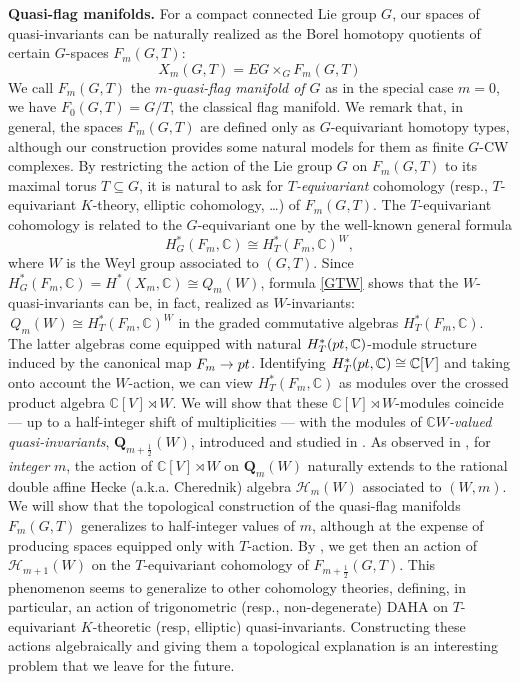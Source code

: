 \documentclass[11pt]{amsart}
\theoremstyle{definition}
\theoremstyle{remark}
\numberwithin{equation}{section}
\newcommand{\la}{\label}
\def\C{\mathbb C}
\begin{document}
\vspace*{1ex}

\noindent
{\bf Quasi-flag manifolds.} 
For a compact connected Lie group $G$, our spaces of quasi-invariants can be naturally realized as the Borel homotopy quotients of certain $G$-spaces  $ F_m(G,T) $:
%
$$ 
X_m(G,T) = EG \times_G F_m(G,T)
$$
%
We call $ F_m(G,T) $ the {\it $m$-quasi-flag manifold of $G$} as in the special case $ m = 0 $, we have $ F_0(G,T) =G/T $, the classical flag manifold. We remark that, in general, the spaces $ F_m(G,T)$ are defined only as $G$-equivariant homotopy types, although our construction provides some natural models
for them as finite $G$-CW complexes. By restricting the action of the Lie group $G$ on $ F_m(G,T)$ to its maximal torus $ T \subseteq G  $, it is natural to ask for {\it $T$-equivariant} cohomology (resp., $T$-equivariant $K$-theory, elliptic cohomology, \ldots) of $F_m(G,T)$. The $T$-equivariant cohomology is related to the $G$-equivariant one by the well-known general formula
%
\begin{equation}\la{GTW}
H^*_G(F_m, \C) \cong H^*_T(F_m, \C)^W , 
\end{equation}
%
where $W$ is the Weyl group associated to $(G,T)$. Since $ H^*_G(F_m, \C) = H^*(X_m, \C) \cong Q_m(W) $, formula \eqref{GTW} shows that the $W$-quasi-invariants can be, in fact, realized as $W$-invariants: $\, Q_m(W) \cong  H^*_T(F_m, \C)^W $  in the graded commutative algebras $ H^*_T(F_m, \C) $. The latter algebras come equipped with natural $ H^*_{T}({\rm pt}, \C)$-module structure induced by the canonical map $ F_m \to {\rm pt} $. Identifying $  H^*_{T}({\rm pt}, \C)  \cong \C[V] $ and taking onto account the  $W$-action, we can view $ H^*_T(F_m, \C) $ as modules over the crossed product algebra $ \C[V] \rtimes W $. We will show that these $\C[V] \rtimes W$-modules coincide --- up to a half-integer shift of multiplicities --- with the modules of {\it $\C W$-valued quasi-invariants}, $ \mathbf{Q}_{m+\frac{1}{2}}(W) $, introduced and studied in \cite{BC11}. As observed in \cite{BC11}, for {\it integer} $m$,
the action of $ \C[V] \rtimes W $ on $ \mathbf{Q}_{m}(W) $ naturally extends to  the rational double affine Hecke (a.k.a. Cherednik) algebra $ {\mathcal H}_m(W) $ associated to $(W,m)$. We will show that the topological construction of the quasi-flag manifolds $F_m(G,T)$ generalizes to half-integer values of $m$, although at the expense of producing spaces equipped only with $T$-action. By \cite{BC11}, we get then an action of $ {\mathcal H}_{m+1}(W) $ on the $T$-equivariant cohomology of $ F_{m+\frac{1}{2}}(G,T)$. This phenomenon seems to generalize to other cohomology theories, 
defining, in particular, an action of trigonometric (resp., non-degenerate) DAHA on $T$-equivariant $K$-theoretic (resp, elliptic) quasi-invariants. Constructing these actions algebraically and giving them a topological explanation is an interesting problem that we leave for the future.
\end{document}
